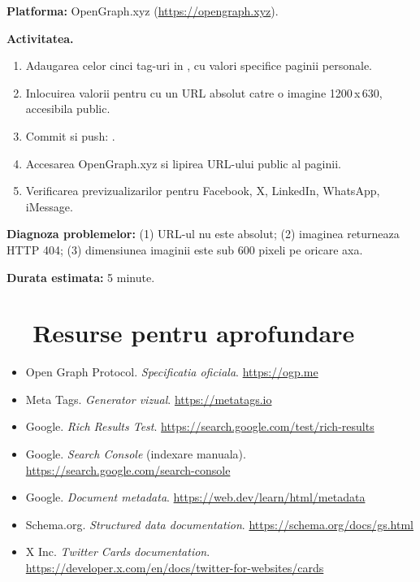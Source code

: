 \begin{joc}
\textbf{Platforma:} OpenGraph.xyz (\url{https://opengraph.xyz}).

\medskip

\textbf{Activitatea.}
\begin{enumerate}[itemsep=1pt]
  \item Adaugarea celor cinci tag-uri  in , cu valori specifice paginii personale.
  \item Inlocuirea valorii pentru  cu un URL absolut catre o imagine 1200\,x\,630, accesibila public.
  \item Commit si push: .
  \item Accesarea OpenGraph.xyz si lipirea URL-ului public al paginii.
  \item Verificarea previzualizarilor pentru Facebook, X, LinkedIn, WhatsApp, iMessage.
\end{enumerate}

\textbf{Diagnoza problemelor:} (1) URL-ul  nu este absolut; (2) imaginea returneaza HTTP 404; (3) dimensiunea imaginii este sub 600 pixeli pe oricare axa.

\medskip

\textbf{Durata estimata:} 5 minute.
\end{joc}

\section*{\faGraduationCap\ \ Resurse pentru aprofundare}

\begin{itemize}[itemsep=2pt]
  \item Open Graph Protocol. \emph{Specificatia oficiala}. \url{https://ogp.me}
  \item Meta Tags. \emph{Generator vizual}. \url{https://metatags.io}
  \item Google. \emph{Rich Results Test}. \url{https://search.google.com/test/rich-results}
  \item Google. \emph{Search Console} (indexare manuala). \url{https://search.google.com/search-console}
  \item Google. \emph{Document metadata}. \url{https://web.dev/learn/html/metadata}
  \item Schema.org. \emph{Structured data documentation}. \url{https://schema.org/docs/gs.html}
  \item X Inc. \emph{Twitter Cards documentation}. \url{https://developer.x.com/en/docs/twitter-for-websites/cards}
\end{itemize}

\bigskip

